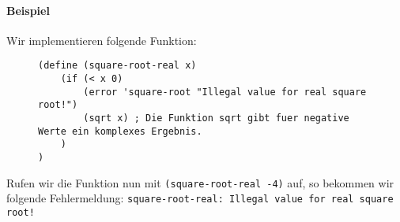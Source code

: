 	\paragraph{Beispiel}
		Wir implementieren folgende Funktion:
		\begin{figure}[H]
			\centering
			\begin{lstlisting}[language = Racket]
(define (square-root-real x)
	(if (< x 0)
		(error 'square-root "Illegal value for real square root!")
		(sqrt x) ; Die Funktion sqrt gibt fuer negative Werte ein komplexes Ergebnis.
	)
)
			\end{lstlisting}
		\end{figure}
	
		Rufen wir die Funktion nun mit \lstinline[language = Racket]|(square-root-real -4)| auf, so bekommen wir folgende Fehlermeldung: \texttt{square-root-real: Illegal value for real square root!}
